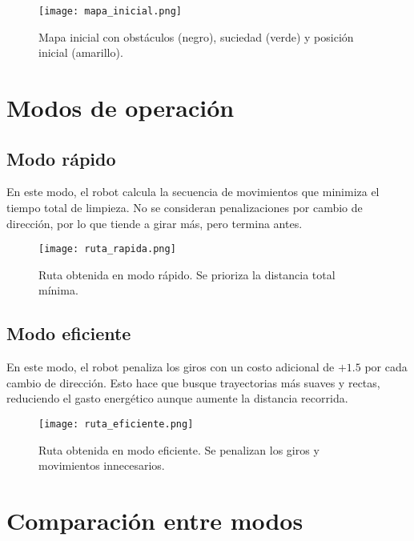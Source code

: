 \documentclass[12pt,a4paper]{article}
\begin{document}
\begin{figure}[H]
    \centering
    \texttt{[image: mapa\_inicial.png]}
    \caption{Mapa inicial con obstáculos (negro), suciedad (verde) y posición inicial (amarillo).}
\end{figure}

\section{Modos de operación}

\subsection{Modo rápido}

En este modo, el robot calcula la secuencia de movimientos que minimiza el tiempo total de limpieza.  
No se consideran penalizaciones por cambio de dirección, por lo que tiende a girar más, pero termina antes.

\begin{figure}[H]
    \centering
    \texttt{[image: ruta\_rapida.png]}
    \caption{Ruta obtenida en modo rápido. Se prioriza la distancia total mínima.}
\end{figure}

\subsection{Modo eficiente}

En este modo, el robot penaliza los giros con un costo adicional de $+1.5$ por cada cambio de dirección.  
Esto hace que busque trayectorias más suaves y rectas, reduciendo el gasto energético aunque aumente la distancia recorrida.

\begin{figure}[H]
    \centering
    \texttt{[image: ruta\_eficiente.png]}
    \caption{Ruta obtenida en modo eficiente. Se penalizan los giros y movimientos innecesarios.}
\end{figure}

\section{Comparación entre modos}
\end{document}
